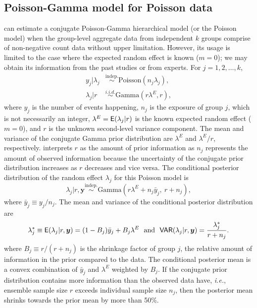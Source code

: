 \documentclass[article]{jss}
\begin{document}
\subsection[Poisson-Gamma]{Poisson-Gamma model for Poisson data}\label{poissonsubsec}
 can estimate a conjugate Poisson-Gamma hierarchical model (or the Poisson model) when the group-level aggregate data from independent $k$ groups comprise of non-negative count data without upper limitation. However, its usage is limited to the case where the expected random effect is known ($m=0$); we may obtain its information from the past studies or from experts. For $j=1, 2, \ldots, k$, 
\begin{align}
y_j\vert \lambda_j &\stackrel{\textrm{indep.}}{\sim}  \textrm{Poisson}(n_{j}\lambda_{j}),\\
\lambda_{j}\vert r &\stackrel{i.i.d.}{\sim} \textrm{Gamma}(r\lambda^E, r),
\end{align}
where $y_j$ is the number of events happening, $n_{j}$ is the exposure of group $j$, which is not necessarily an integer, $\lambda^E=\mathsf{E}(\lambda_j\vert r)$ is the known expected random effect ($m=0$), and $r$ is the unknown second-level variance component. The mean and variance of the conjugate Gamma prior distribution are $\lambda^E$ and $\lambda^E/r$, respectively.  \cite{albert1988computational} interprets $r$ as the amount of prior information as $n_{j}$ represents the amount of observed information because the uncertainty of the conjugate prior distribution increases as $r$ decreases and vice versa. The conditional posterior distribution of the random effect $\lambda_j$ for this Poisson model is
\begin{equation} \label{gammapost}
\lambda_j\vert r, \boldsymbol{y} \stackrel{\textrm{indep.}}{\sim}\textrm{Gamma}(r\lambda^E + n_j\bar{y}_{j},~ r + n_j),
\end{equation}  
where $\bar{y}_j\equiv y_j/n_j$. The mean and variance of the conditional posterior distribution are
\begin{equation}\label{gammapost_mean_var}
\lambda^\ast_j\equiv \mathsf{E}(\lambda_j\vert r, \boldsymbol{y} )=(1-B_{j})\bar{y}_{j} + B_{j}\lambda^E~~\textrm{and}~~\mathsf{VAR}(\lambda_j\vert r, \boldsymbol{y})=\frac{\lambda^\ast_j}{r+n_j}.
\end{equation}
where $B_{j}\equiv r / (r+n_{j})$ is the shrinkage factor of group $j$, the relative amount of information in the prior compared to the data. The conditional posterior mean is  a convex combination of $\bar{y}_{j}$ and  $\lambda^E$ weighted by $B_j$. If the conjugate prior distribution contains more information than the observed data have, \emph{i.e.}, ensemble sample size $r$ exceeds individual sample size $n_{j}$, then the posterior mean shrinks  towards the prior mean by more than 50\%.%
\end{document}
